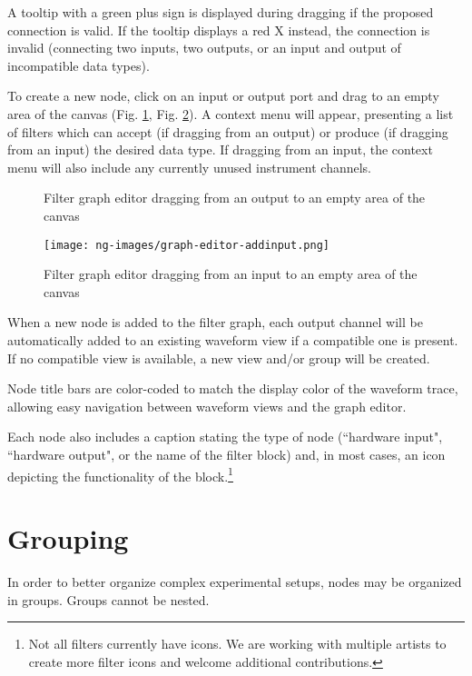 A tooltip with a green plus sign is displayed during dragging if the proposed connection is valid. If the tooltip
displays a red X instead, the connection is invalid (connecting two inputs, two outputs, or an input and output of
incompatible data types).

To create a new node, click on an input or output port and drag to an empty area of the canvas (Fig.
\ref{graph-editor-create}, Fig. \ref{graph-editor-addinput}). A context menu will appear, presenting a list of filters
which can accept (if dragging from an output) or produce (if dragging from an input) the desired data type. If dragging
from an input, the context menu will also include any currently unused instrument channels.

\begin{figure}[H]
\centering
{}
\caption{Filter graph editor dragging from an output to an empty area of the canvas}
\label{graph-editor-create}
\end{figure}

\begin{figure}[H]
\centering
\texttt{[image: ng-images/graph-editor-addinput.png]}
\caption{Filter graph editor dragging from an input to an empty area of the canvas}
\label{graph-editor-addinput}
\end{figure}

When a new node is added to the filter graph, each output channel will be automatically added to an existing waveform
view if a compatible one is present. If no compatible view is available, a new view and/or group will be created.

Node title bars are color-coded to match the display color of the waveform trace, allowing easy navigation between
waveform views and the graph editor.

Each node also includes a caption stating the type of node (``hardware input", ``hardware output", or the name of the
filter block) and, in most cases, an icon depicting the functionality of the block.\footnote{Not all filters currently
have icons. We are working with multiple artists to create more filter icons and welcome additional contributions.}

\section{Grouping}

In order to better organize complex experimental setups, nodes may be organized in groups. Groups cannot be nested.

